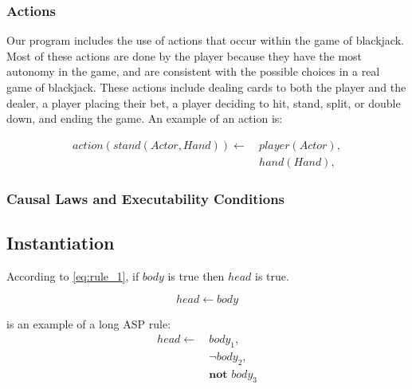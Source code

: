 \documentclass{article}
\begin{document}
\subsubsection{Actions}

Our program includes the use of actions that occur within the game of blackjack.
Most of these actions are done by the player because they have the most autonomy in the game,
and are consistent with the possible choices in a real game of blackjack.
These actions include dealing cards to both the player and the dealer, a player placing their bet,
a player deciding to hit, stand, split, or double down, and ending the game.
An example of an action is:

\begin{equation}
    \begin{split}
        action(stand(Actor, Hand)) \leftarrow \
            & player(Actor), \\
            & hand(Hand),
    \end{split}
\end{equation}

\subsubsection{Causal Laws and Executability Conditions}

\subsection{Instantiation}


According to \cref{eq:rule_1}, if $body$ is true then $head$ is true.

\begin{equation}
    \label{eq:rule_1}
    head \leftarrow body
\end{equation}

 is an example of a long ASP rule:
\begin{equation}
\begin{split}
    \label{eq:rule_2}
    head \leftarrow \
        & body_1, \\
        & \neg body_2, \\
        & \textbf{not } body_3
\end{split}
\end{equation}
\end{document}
